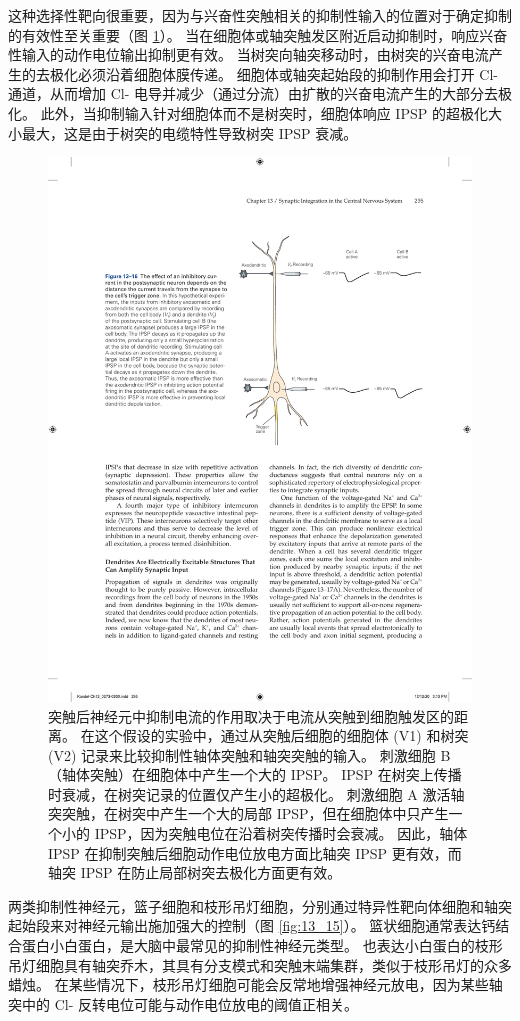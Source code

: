 这种选择性靶向很重要，因为与兴奋性突触相关的抑制性输入的位置对于确定抑制的有效性至关重要（图 \ref{fig:13_16}）。 
当在细胞体或轴突触发区附近启动抑制时，响应兴奋性输入的动作电位输出抑制更有效。 
当树突向轴突移动时，由树突的兴奋电流产生的去极化必须沿着细胞体膜传递。 
细胞体或轴突起始段的抑制作用会打开 Cl- 通道，从而增加 Cl- 电导并减少（通过分流）由扩散的兴奋电流产生的大部分去极化。 
此外，当抑制输入针对细胞体而不是树突时，细胞体响应 IPSP 的超极化大小最大，这是由于树突的电缆特性导致树突 IPSP 衰减。

\begin{figure}[htbp]
	\centering
	\includegraphics[width=0.6\linewidth]{chap13/fig_13_16}
	\caption{突触后神经元中抑制电流的作用取决于电流从突触到细胞触发区的距离。 在这个假设的实验中，通过从突触后细胞的细胞体 (V1) 和树突 (V2) 记录来比较抑制性轴体突触和轴突突触的输入。 刺激细胞 B（轴体突触）在细胞体中产生一个大的 IPSP。 IPSP 在树突上传播时衰减，在树突记录的位置仅产生小的超极化。 刺激细胞 A 激活轴突突触，在树突中产生一个大的局部 IPSP，但在细胞体中只产生一个小的 IPSP，因为突触电位在沿着树突传播时会衰减。 因此，轴体 IPSP 在抑制突触后细胞动作电位放电方面比轴突 IPSP 更有效，而轴突 IPSP 在防止局部树突去极化方面更有效。}
	\label{fig:13_16}
\end{figure}


两类抑制性神经元，篮子细胞和枝形吊灯细胞，分别通过特异性靶向体细胞和轴突起始段来对神经元输出施加强大的控制（图 \ref{fig:13_15}）。 
篮状细胞通常表达钙结合蛋白小白蛋白，是大脑中最常见的抑制性神经元类型。 
也表达小白蛋白的枝形吊灯细胞具有轴突乔木，其具有分支模式和突触末端集群，类似于枝形吊灯的众多蜡烛。 
在某些情况下，枝形吊灯细胞可能会反常地增强神经元放电，因为某些轴突中的 Cl- 反转电位可能与动作电位放电的阈值正相关。



